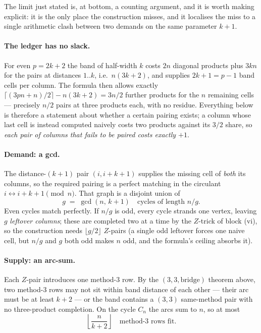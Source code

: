 The limit just stated is, at bottom, a counting argument, and it is worth
making explicit: it is the only place the construction misses, and it
localises the miss to a single arithmetic clash between two demands on the
same parameter \(k{+}1\).

\paragraph{The ledger has no slack.} For even \(p = 2k+2\) the band of
half-width \(k\) costs \(2n\) diagonal products plus \(3kn\) for the pairs at
distances \(1..k\), i.e.\ \(n(3k{+}2)\), and supplies \(2k{+}1 = p{-}1\) band
cells per column. The formula then allows exactly
\(\lceil (3pn{+}n)/2 \rceil - n(3k{+}2) = 3n/2\) further products for the
\(n\) remaining cells --- precisely \(n/2\) pairs at three products each,
with no residue. Everything below is therefore a statement about whether a
certain pairing exists; a column whose last cell is instead computed
naively costs two products against its \(3/2\) share, so \emph{each pair of
columns that fails to be paired costs exactly \(+1\)}.

\paragraph{Demand: a gcd.} The distance-\((k{+}1)\) pair \((i, i{+}k{+}1)\)
supplies the missing cell of \emph{both} its columns, so the required pairing
is a perfect matching in the circulant \(i \leftrightarrow i{+}k{+}1
\pmod n\). That graph is a disjoint union of
\[
  g \;=\; \gcd(n,\, k{+}1) \quad\text{cycles of length } n/g .
\]
Even cycles match perfectly. If \(n/g\) is odd, every cycle strands one
vertex, leaving \(g\) \emph{leftover columns}; these are completed two at a
time by the \(Z\)-trick of block (vi), so the construction needs
\(\lfloor g/2 \rfloor\) \(Z\)-pairs (a single odd leftover forces one naive
cell, but \(n/g\) and \(g\) both odd makes \(n\) odd, and the formula's
ceiling absorbs it).

\paragraph{Supply: an arc-sum.} Each \(Z\)-pair introduces one method-3 row.
By the \((3,3,\mathrm{bridge})\) theorem above, two method-3 rows may not sit
within band distance of each other --- their arc must be at least
\(k{+}2\) --- or the band contains a \((3,3)\) same-method pair with no
three-product completion. On the cycle \(C_n\) the arcs sum to \(n\), so at
most
\[
  \left\lfloor \frac{n}{k+2} \right\rfloor \quad\text{method-3 rows fit.}
\]

